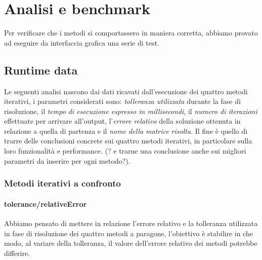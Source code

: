 \section{Analisi e benchmark}

Per verificare che i metodi si comportassero in maniera corretta, abbiamo provato ad eseguire da interfaccia grafica una serie di test.




\subsection{Runtime data}

Le seguenti analisi nascono dai dati ricavati dall'esecuzione dei quattro metodi iterativi, i parametri considerati sono: \textit{tolleranza utilizzata} durante la fase di risoluzione, il \textit{tempo di esecuzione espresso in millisecondi}, il \textit{numero di iterazioni} effettuate per arrivare all'output, l'\textit{errore relativo} della soluzione ottenuta in relazione a quella di partenza e il \textit{nome della matrice risolta}. Il fine è quello di trarre delle conclusioni concrete sui quattro metodi iterativi, in particolare sulla loro funzionalità e performance.
(? e trarne una conclusione anche sui migliori parametri da inserire per ogni metodo?).


\subsubsection{Metodi iterativi a confronto}

\paragraph{tolerance/relativeError}
Abbiamo pensato di mettere in relazione l'errore relativo e la tolleranza utilizzata in fase di risoluzione dei quattro metodi a paragone, l'obiettivo è stabilire in che modo, al variare della tolleranza, il valore dell'errore relativo dei metodi potrebbe differire.



